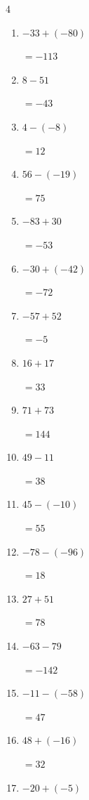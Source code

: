 \begin{multicols}{4}
\begin{enumerate}
  \item $-33+(-80)$

        $=-113$

  \item $8-51$

        $=-43$

  \item $4-(-8)$

        $=12$

  \item $56-(-19)$

        $=75$

  \item $-83+30$

        $=-53$

  \item $-30+(-42)$

        $=-72$

  \item $-57+52$

        $=-5$

  \item $16+17$

        $=33$

  \item $71+73$

        $=144$

  \item $49-11$

        $=38$

  \item $45-(-10)$

        $=55$

  \item $-78-(-96)$

        $=18$

\columnbreak %

  \item $27+51$

        $=78$

  \item $-63-79$

        $=-142$

  \item $-11-(-58)$

        $=47$

  \item $48+(-16)$

        $=32$

  \item $-20+(-5)$


\end{enumerate}
\end{multicols}
